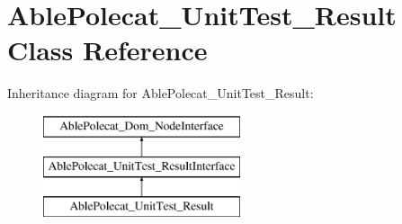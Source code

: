 \hypertarget{class_able_polecat___unit_test___result}{}\section{Able\+Polecat\+\_\+\+Unit\+Test\+\_\+\+Result Class Reference}
\label{class_able_polecat___unit_test___result}
Inheritance diagram for Able\+Polecat\+\_\+\+Unit\+Test\+\_\+\+Result\+:\begin{figure}[H]
\begin{center}
\leavevmode
\includegraphics[height=3.000000cm]{class_able_polecat___unit_test___result}
\end{center}
\end{figure}
